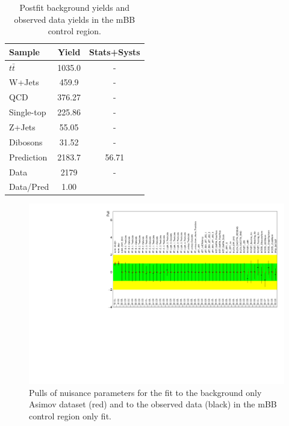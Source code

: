 \begin{table}
\begin{center}
\begin{tabular}{l|c|c} 
Sample        &    Yield &  Stats+Systs \\ 
\hline 
$t\bar{t}$    &  1035.0  & - \\ 
W+Jets        &  459.9   & - \\ 
QCD           &  376.27  & - \\ 
Single-top    &  225.86  & - \\ 
Z+Jets        &  55.05   & - \\ 
Dibosons      &  31.52   & -  \\ 
\hline 
Prediction    &  2183.7  &  56.71 \\ 
Data          &  2179    &  -\\ 
\hline 
Data/Pred     &  1.00    &  \\ 
\hline 
\end{tabular} 
\end{center}
\caption{Postfit background yields and observed data yields in the mBB control region.}
\label{tab:boosted_bkgd_mbbcr_yields_postfit}
\end{table}


\begin{figure}[!h]
\begin{center}
\includegraphics*[width=1.00\textwidth]{./figures/boosted/CROnlyFit/NP_allExceptGammas}
\caption{Pulls of nuisance parameters for the fit to the background only Asimov dataset (red) 
and to the observed data (black) in the mBB control region only fit.}
\label{fig:boosted_fitstudies_mBBcr_pullplot}
\end{center}
\end{figure}

